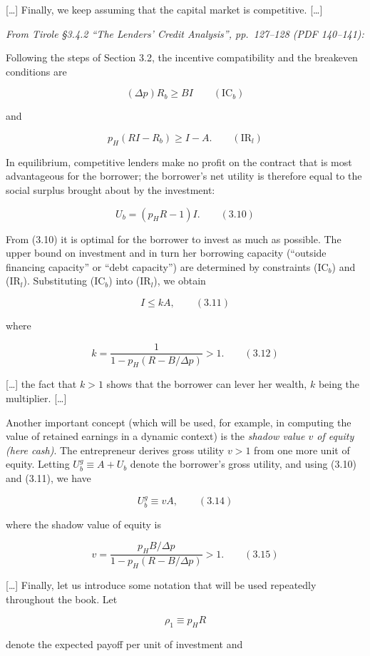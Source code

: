 \documentclass[11pt,a4paper]{article}
\begin{document}
{[}\ldots{]} Finally, we keep assuming that the capital market is competitive. {[}\ldots{]}

\emph{From Tirole §3.4.2 ``The Lenders' Credit Analysis'', pp.~127--128 (PDF 140--141):}

Following the steps of Section 3.2, the incentive compatibility and the breakeven conditions are

\[(\Delta p) R_b \geqslant BI \qquad (\text{IC}_b)\]

and

\[p_H(RI - R_b) \geqslant I - A. \qquad (\text{IR}_l)\]

In equilibrium, competitive lenders make no profit on the contract that is most advantageous for the
borrower; the borrower's net utility is therefore equal to the social surplus brought about by the
investment:

\[U_b = (p_H R - 1) I. \qquad (3.10)\]

From (3.10) it is optimal for the borrower to invest as much as possible. The upper bound on
investment and in turn her borrowing capacity (``outside financing capacity'' or ``debt capacity'')
are determined by constraints (IC\(_b\)) and (IR\(_l\)). Substituting (IC\(_b\)) into (IR\(_l\)), we
obtain

\[I \leqslant kA, \qquad (3.11)\]

where

\[k = \frac{1}{1 - p_H(R - B/\Delta p)} > 1. \qquad (3.12)\]

{[}\ldots{]} the fact that \(k > 1\) shows that the borrower can lever her wealth, \(k\) being the
multiplier. {[}\ldots{]}

Another important concept (which will be used, for example, in computing the value of retained
earnings in a dynamic context) is the \emph{shadow value \(v\) of equity (here cash)}. The
entrepreneur derives gross utility \(v > 1\) from one more unit of equity. Letting
\(U_b^g \equiv A + U_b\) denote the borrower's gross utility, and using (3.10) and (3.11), we have

\[U_b^g \equiv vA, \qquad (3.14)\]

where the shadow value of equity is

\[v = \frac{p_H B/\Delta p}{1 - p_H(R - B/\Delta p)} > 1. \qquad (3.15)\]

{[}\ldots{]} Finally, let us introduce some notation that will be used repeatedly throughout the
book. Let

\[\rho_1 \equiv p_H R\]

denote the expected payoff per unit of investment and
\end{document}
